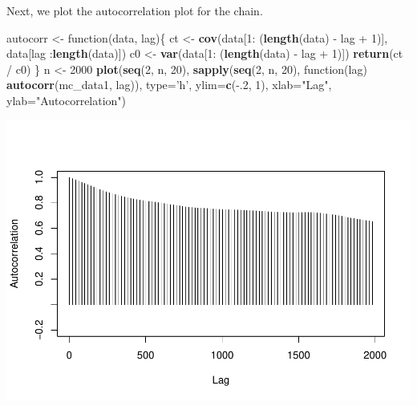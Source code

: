 \documentclass[]{article}
\newenvironment{Shaded}{\begin{snugshade}}{\end{snugshade}}
\newcommand{\KeywordTok}[1]{\textcolor[rgb]{0.13,0.29,0.53}{\textbf{{#1}}}}
\newcommand{\DataTypeTok}[1]{\textcolor[rgb]{0.13,0.29,0.53}{{#1}}}
\newcommand{\DecValTok}[1]{\textcolor[rgb]{0.00,0.00,0.81}{{#1}}}
\newcommand{\StringTok}[1]{\textcolor[rgb]{0.31,0.60,0.02}{{#1}}}
\newcommand{\NormalTok}[1]{{#1}}
\begin{document}
Next, we plot the autocorrelation plot for the chain.

\begin{Shaded}
\begin{Highlighting}[]
\NormalTok{autocorr <-}\StringTok{ }\NormalTok{function(data, lag)\{}
  \NormalTok{ct <-}\StringTok{ }\KeywordTok{cov}\NormalTok{(data[}\DecValTok{1}\NormalTok{:}\StringTok{ }\NormalTok{(}\KeywordTok{length}\NormalTok{(data) -}\StringTok{ }\NormalTok{lag +}\StringTok{ }\DecValTok{1}\NormalTok{)], data[lag :}\KeywordTok{length}\NormalTok{(data)])}
  \NormalTok{c0 <-}\StringTok{ }\KeywordTok{var}\NormalTok{(data[}\DecValTok{1}\NormalTok{:}\StringTok{ }\NormalTok{(}\KeywordTok{length}\NormalTok{(data) -}\StringTok{ }\NormalTok{lag +}\StringTok{ }\DecValTok{1}\NormalTok{)])}
  \KeywordTok{return}\NormalTok{(ct /}\StringTok{ }\NormalTok{c0)}
\NormalTok{\}  }
\NormalTok{n <-}\StringTok{ }\DecValTok{2000}
\KeywordTok{plot}\NormalTok{(}\KeywordTok{seq}\NormalTok{(}\DecValTok{2}\NormalTok{, n, }\DecValTok{20}\NormalTok{), }\KeywordTok{sapply}\NormalTok{(}\KeywordTok{seq}\NormalTok{(}\DecValTok{2}\NormalTok{, n, }\DecValTok{20}\NormalTok{), function(lag) }\KeywordTok{autocorr}\NormalTok{(mc_data1, lag)), }
     \DataTypeTok{type=}\StringTok{'h'}\NormalTok{, }\DataTypeTok{ylim=}\KeywordTok{c}\NormalTok{(-.}\DecValTok{2}\NormalTok{, }\DecValTok{1}\NormalTok{), }\DataTypeTok{xlab=}\StringTok{"Lag"}\NormalTok{, }\DataTypeTok{ylab=}\StringTok{"Autocorrelation"}\NormalTok{)}
\end{Highlighting}
\end{Shaded}

\includegraphics{Atlas-PS_6_files/figure-latex/unnamed-chunk-6-1.pdf}
\end{document}

